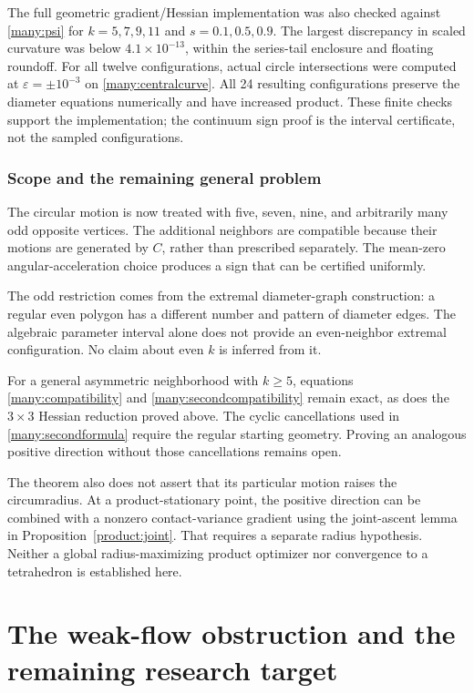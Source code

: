 \documentclass[11pt]{article}
\theoremstyle{remark}\newtheorem{remark}[theorem]{Remark}
\begin{document}
The full geometric gradient/Hessian implementation was also checked
against \eqref{many:psi} for $k=5,7,9,11$ and $s=0.1,0.5,0.9$.
The largest discrepancy in scaled curvature was below
$4.1\times10^{-13}$, within the series-tail enclosure and floating
roundoff. For all twelve configurations, actual circle intersections
were computed at $\varepsilon=\pm10^{-3}$ on
\eqref{many:centralcurve}. All 24 resulting configurations preserve the
diameter equations numerically and have increased product.
These finite checks support the implementation; the continuum sign
proof is the interval certificate, not the sampled configurations.

\section{Scope and the remaining general problem}
The circular motion is now treated with five, seven, nine, and
arbitrarily many odd opposite vertices. The additional neighbors
are compatible because their motions are generated by $C$, rather
than prescribed separately. The mean-zero angular-acceleration
choice produces a sign that can be certified uniformly.

The odd restriction comes from the extremal diameter-graph
construction: a regular even polygon has a different number and
pattern of diameter edges. The algebraic parameter interval alone
does not provide an even-neighbor extremal configuration. No claim
about even $k$ is inferred from it.

For a general asymmetric neighborhood with $k\geq5$, equations
\eqref{many:compatibility} and \eqref{many:secondcompatibility} remain exact,
as does the $3\times3$ Hessian reduction proved above.
The cyclic cancellations used in \eqref{many:secondformula} require the
regular starting geometry. Proving an analogous positive direction
without those cancellations remains open.

The theorem also does not assert that its particular motion raises
the circumradius. At a product-stationary point, the positive
direction can be combined with a nonzero contact-variance gradient
using the joint-ascent lemma in Proposition~\ref{product:joint}.
That requires a separate radius hypothesis. Neither a global
radius-maximizing product optimizer nor convergence to a tetrahedron
is established here.


\part{The weak-flow obstruction and the remaining research target}
\end{document}
